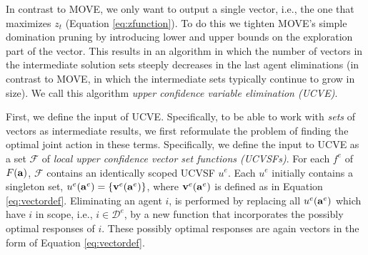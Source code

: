 \documentclass{article}
\begin{document}
In contrast to MOVE, we only want to output a single vector, i.e., the one that maximizes $z_t$
(Equation \ref{eq:zfunction}). To do this we tighten MOVE's simple domination pruning by introducing
lower and upper bounds on the exploration part of the vector. This results in an algorithm in which
the number of vectors in the intermediate solution sets steeply decreases in the last agent
eliminations (in contrast to MOVE, in which the intermediate sets typically continue to grow in
size).  We call this algorithm  \emph{upper confidence variable elimination (UCVE)}.

First, we define the input of UCVE. Specifically, to be able to work with
\emph{sets} of vectors as intermediate results, we first reformulate the problem of finding the
optimal joint action in these terms. Specifically, we define the input to UCVE as a set
$\mathcal{F}$ of \emph{local upper confidence vector set functions (UCVSFs)}.
%
For each $f^e$ of $F({\bf a})$, $\mathcal{F}$ contains an identically scoped UCVSF $u^e$.
Each $u^e$ initially contains a singleton set, $u^e({\bf a}^e) = \{ {\bf v}^e({\bf a}^e) \}$,
where ${\bf v}^e({\bf a}^e)$ is defined as in Equation \ref{eq:vectordef}.
Eliminating an agent $i$, is performed by replacing all $u^e({\bf a}^e)$ which have $i$ in scope,
i.e., $i \in \mathcal{D}^e$, by a new function that incorporates the possibly optimal responses of
$i$. These possibly optimal responses are again vectors in the form of Equation \ref{eq:vectordef}.
\end{document}
